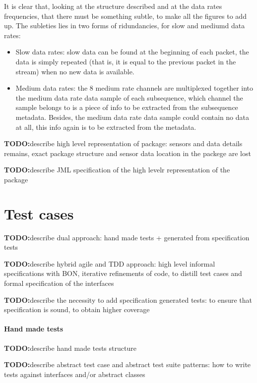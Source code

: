 \documentclass{article}
\newcommand{\todo}{\textbf{TODO:}}
\begin{document}
It is clear that, looking at the structure described and at the data rates 
frequencies, that there must be something subtle, to make all the figures to 
add up.
The subleties lies in two forms of ridundancies, for slow and mediumd data 
rates:

\begin{itemize}
  \item Slow data rates: slow data can be found at the beginning of each 
  packet, the data is simply repeated (that is, it is equal to the previous 
  packet in the stream) when no new data is available.
  \item Medium data rates: the 8 medium rate channels are multiplexed together 
  into the medium data rate data sample of each subsequence, which channel the 
  sample belongs to is a piece of info to be extracted from the subsequence 
  metadata. Besides, the medium data rate data sample could contain no data at 
  all, this info again is to be extracted from the metadata.
\end{itemize}

\todo describe high level representation of package: sensors and data 
details remains, exact package structure and sensor data location in the
packege are lost

\todo describe JML specification of the high levelr representation of the 
package


\section{Test cases}
\label{sec:test_cases}

\todo describe dual approach: hand made tests + generated from 
specification tests

\todo describe hybrid agile and TDD approach: high level informal 
specifications with BON, iterative refinements of code, to distill 
test cases and formal specification of the interfaces

\todo describe the necessity to add specification generated tests: to ensure
that specification is sound, to obtain higher coverage

\paragraph*{Hand made tests}

\todo describe hand made tests structure

\todo describe abstract test case and abstract test suite patterns: how to 
write tests against interfaces and/or abstract classes
\end{document}

